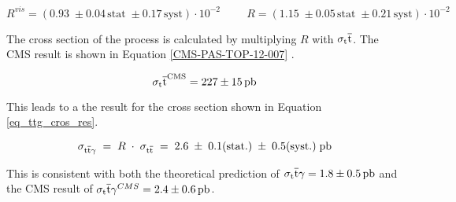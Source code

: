 \begin{equation}
R^{vis} = (0.93 \;\pm 0.04\,\mathrm{stat}\;\pm 0.17\,\mathrm{syst})\cdot 10^{-2} \hspace{1cm} R = (1.15 \;\pm 0.05\,\mathrm{stat}\;\pm 0.21\,\mathrm{syst})\cdot 10^{-2}
\label{eq_ttg_cros_Rres}
\end{equation}

The cross section of the \ttgamma process is calculated by multiplying $R$ with $\sigma_\ttbar$. The CMS result is shown in Equation \ref{CMS-PAS-TOP-12-007} .

\begin{equation}
\sigma_\ttbar^{\mathrm{CMS}} = \SI{227 \pm 15}{\pico \barn}
\label{eq_ttg_cros_restt}
\end{equation}

This leads to a the result for the \ttgamma cross section shown in Equation \ref{eq_ttg_cros_res}.

\begin{equation}
\sigma_{\ttgamma} \;=\; R\;\cdot \;\sigma_{\ttbar} \; =\; 2.6\;\pm \;0.1\mathrm{ (stat.)} \;\pm \;0.5\mathrm{ (syst.)}\; \SI{}{\pico \barn}
\label{eq_ttg_cros_restt}
\end{equation}

This is consistent with both the theoretical prediction of $\sigma_\ttgamma = \SI{1.8 \pm 0.5}{\pico \barn}$ and the CMS result of $\sigma_\ttgamma^{CMS} = \SI{2.4\pm 0.6}{\pico \barn}$.